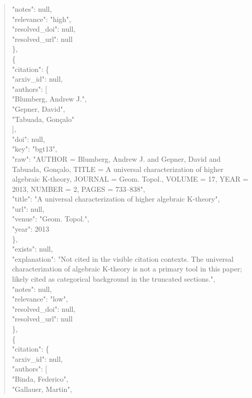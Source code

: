 \documentclass[11pt]{article}
\begin{document}
\begin{quote}
      "notes": null,\\
      "relevance": "high",\\
      "resolved\_doi": null,\\
      "resolved\_url": null\\
    \},\\
    \{\\
      "citation": \{\\
        "arxiv\_id": null,\\
        "authors": [\\
          "Blumberg, Andrew J.",\\
          "Gepner, David",\\
          "Tabuada, Gonçalo"\\
        ],\\
        "doi": null,\\
        "key": "bgt13",\\
        "raw": "AUTHOR = Blumberg, Andrew J. and Gepner, David and Tabuada, Gonçalo, TITLE = A universal characterization of higher algebraic K-theory, JOURNAL = Geom. Topol., VOLUME = 17, YEAR = 2013, NUMBER = 2, PAGES = 733--838",\\
        "title": "A universal characterization of higher algebraic K-theory",\\
        "url": null,\\
        "venue": "Geom. Topol.",\\
        "year": 2013\\
      \},\\
      "exists": null,\\
      "explanation": "Not cited in the visible citation contexts. The universal characterization of algebraic K-theory is not a primary tool in this paper; likely cited as categorical background in the truncated sections.",\\
      "notes": null,\\
      "relevance": "low",\\
      "resolved\_doi": null,\\
      "resolved\_url": null\\
    \},\\
    \{\\
      "citation": \{\\
        "arxiv\_id": null,\\
        "authors": [\\
          "Binda, Federico",\\
          "Gallauer, Martin",\\

\end{quote}
\end{document}
